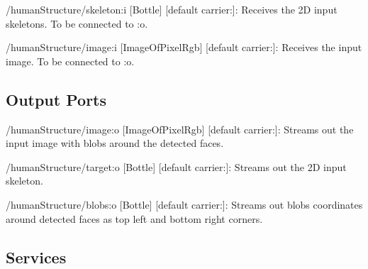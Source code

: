 \begin{DoxyItemize}
\item /human\+Structure/skeleton\+:i \mbox{[}Bottle\mbox{]} \mbox{[}default carrier\+:\mbox{]}\+: Receives the 2D input skeletons. To be connected to \+:o.
\item /human\+Structure/image\+:i \mbox{[}Image\+Of\+Pixel\+Rgb\mbox{]} \mbox{[}default carrier\+:\mbox{]}\+: Receives the input image. To be connected to \+:o.
\end{DoxyItemize}\hypertarget{group__skeletonViewer_outputports_sec}{}\subsection{Output Ports}\label{group__skeletonViewer_outputports_sec}

\begin{DoxyItemize}
\item /human\+Structure/image\+:o \mbox{[}Image\+Of\+Pixel\+Rgb\mbox{]} \mbox{[}default carrier\+:\mbox{]}\+: Streams out the input image with blobs around the detected faces.
\item /human\+Structure/target\+:o \mbox{[}Bottle\mbox{]} \mbox{[}default carrier\+:\mbox{]}\+: Streams out the 2D input skeleton.
\item /human\+Structure/blobs\+:o \mbox{[}Bottle\mbox{]} \mbox{[}default carrier\+:\mbox{]}\+: Streams out blobs\textquotesingle{} coordinates around detected faces as top left and bottom right corners.
\end{DoxyItemize}\hypertarget{group__skeletonViewer_services_sec}{}\subsection{Services}\label{group__skeletonViewer_services_sec}
